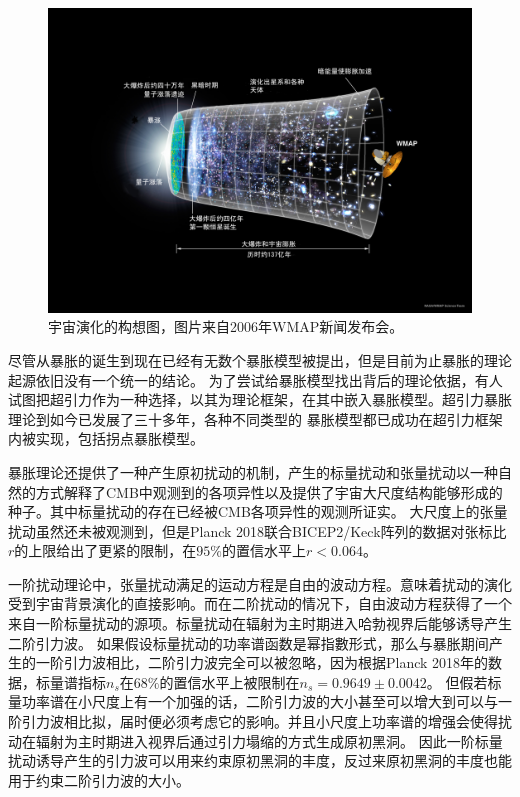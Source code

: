 \begin{figure}[!htbp]
  \centering
  \includegraphics[width=6in]{Img/CMB_Timeline75_zh-cnversion.jpg}
  \caption{宇宙演化的构想图，图片来自2006年WMAP新闻发布会。}\label{fig:history-of-universe}
\end{figure}

尽管从暴胀的诞生到现在已经有无数个暴胀模型被提出，但是目前为止暴胀的理论起源依旧没有一个统一的结论。
为了尝试给暴胀模型找出背后的理论依据，有人试图把超引力作为一种选择，以其为理论框架，在其中嵌入暴胀模型。超引力暴胀理论到如今已发展了三十多年，各种不同类型的
暴胀模型都已成功在超引力框架内被实现，包括拐点暴胀模型。

暴胀理论还提供了一种产生原初扰动的机制，产生的标量扰动和张量扰动以一种自然的方式解释了CMB中观测到的各项异性以及提供了宇宙大尺度结构能够形成的种子。其中标量扰动的存在已经被CMB各项异性的观测所证实\citep{akrami2018planck}。
大尺度上的张量扰动虽然还未被观测到，但是Planck
2018联合BICEP2/Keck阵列的数据对张标比$r$的上限给出了更紧的限制，在$95\%$的置信水平上$r<0.064$。

一阶扰动理论中，张量扰动满足的运动方程是自由的波动方程。意味着扰动的演化受到宇宙背景演化的直接影响。而在二阶扰动的情况下，自由波动方程获得了一个来自一阶标量扰动的源项\citep{matarrese1998relativistic,acquaviva2002second}。标量扰动在辐射为主时期进入哈勃视界后能够诱导产生二阶引力波。
如果假设标量扰动的功率谱函数是幂指數形式，那么与暴胀期间产生的一阶引力波相比，二阶引力波完全可以被忽略\citep{ananda2007cosmological,baumann2007gravitational}，因为根据Planck
2018年的数据，标量谱指标$n_{s}$在$68\%$的置信水平上被限制在$n_{s}=0.9649\pm 0.0042$。
但假若标量功率谱在小尺度上有一个加强的话，二阶引力波的大小甚至可以增大到可以与一阶引力波相比拟，届时便必须考虑它的影响\citep{assadullahi2009gravitational,alabidi2013observable,alabidi2012observable,chen2019pulsar,cai2019gravitational,inomata2019gravitational,cai2019universal}。并且小尺度上功率谱的增强会使得扰动在辐射为主时期进入视界后通过引力塌缩的方式生成原初黑洞\citep{garcia1996density,clesse2015massive,yokoyama1995formation,dalianis2019primordial,gao2018primordial,di2018primordial,garcia2017primordial,garcia2016gravitational}。
因此一阶标量扰动诱导产生的引力波可以用来约束原初黑洞的丰度，反过来原初黑洞的丰度也能用于约束二阶引力波的大小。

